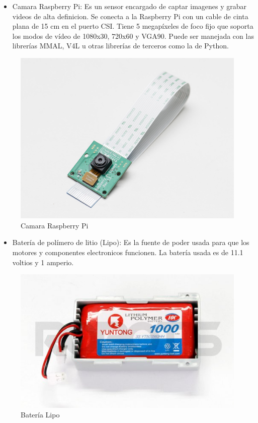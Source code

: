 \begin{itemize}
\item Camara Raspberry Pi: Es un sensor encargado de captar imagenes y grabar videos de alta definicion. Se conecta a la
Raspberry Pi con un cable de cinta plana de 15 cm en el puerto CSI. Tiene 5 megapíxeles de foco fijo que soporta los modos
de vídeo de 1080x30, 720x60 y VGA90. Puede ser manejada con las librerías MMAL, V4L u otras librerías de terceros como la de
Python. \cite{raspberrycam} %

\end{itemize}

\begin{figure}[hbtp]
\centering
\includegraphics[scale=0.7]{imagenes/1367-01.jpg}
\caption{Camara Raspberry Pi}
\end{figure}


\begin{itemize}
\item Batería de polímero de litio (Lipo): Es la fuente de poder usada para que los motores y componentes electronicos
funcionen. La batería usada es de 11.1 voltios y 1 amperio. \cite{bateria}
\end{itemize}


\begin{figure}[hbtp]
\centering
\includegraphics[scale=0.5]{imagenes/R-LIPOBAT.jpg}
\caption{Batería Lipo}
\end{figure}

